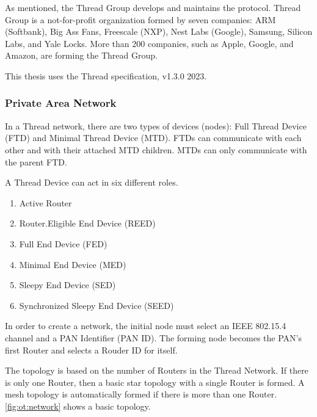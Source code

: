 As mentioned, the Thread Group develops and maintains the protocol.
Thread Group is a not-for-profit organization formed by seven companies:
ARM (Softbank), Big Ass Fans, Freescale (NXP), Nest Labs (Google), Samsung, Silicon Labs, and Yale Locks.
More than 200 companies, such as Apple, Google, and Amazon, are forming the Thread Group. \cite{thread:members}

This thesis uses the Thread specification, v1.3.0 2023.

\subsubsection{Private Area Network}
\label{sec:ot:pan}
In a Thread network, there are two types of devices (nodes): Full Thread Device (FTD) and Minimal Thread Device (MTD). FTDs can communicate with each other and with their attached MTD children. MTDs can only communicate with the parent FTD.

A Thread Device can act in six different roles.
\begin{enumerate}
    \item Active Router
    \item Router.Eligible End Device (REED)
    \item Full End Device (FED)
    \item Minimal End Device (MED)
    \item Sleepy End Device (SED)
    \item Synchronized Sleepy End Device (SEED)
\end{enumerate}

In order to create a network, the initial node must select an IEEE 802.15.4 channel and
a PAN Identifier (PAN ID).
The forming node becomes the PAN's first Router and selects a Rouder ID for itself.

The topology is based on the number of Routers in the Thread Network.
If there is only one Router, then a basic star topology with a single Router is formed.
A mesh topology is automatically formed if there is more than one Router.
\autoref{fig:ot:network} shows a basic topology.

